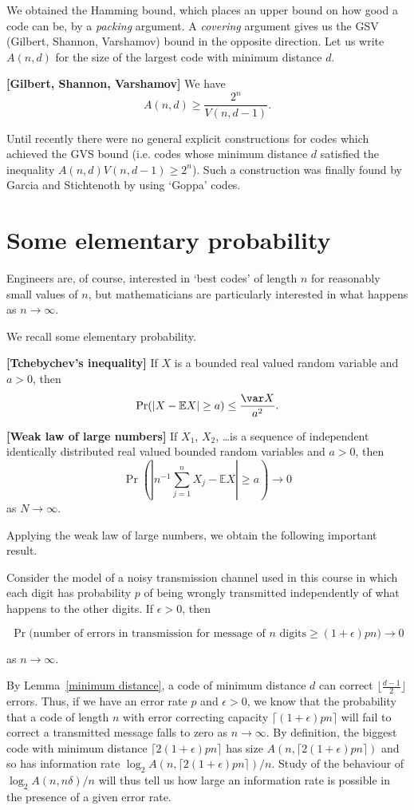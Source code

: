 We obtained the Hamming bound, which
places an upper bound on how good
a code can be, by a \emph{packing} argument.
A \emph{covering} argument gives
us the GSV (Gilbert, Shannon, Varshamov) bound
in the opposite direction. Let us write
$A(n,d)$ for the size of the largest code
with minimum distance $d$.
\begin{theorem} {\bf [Gilbert, Shannon, Varshamov]}\label{GSV}
We have
\[A(n,d)\geq \frac{2^{n}}{V(n,d-1)}.\]
\end{theorem}
Until recently there were no general explicit
constructions for codes which achieved the
GVS bound (i.e. codes whose minimum distance
$d$ satisfied the inequality $A(n,d)V(n,d-1)\geq 2^{n}$).
Such a construction
was finally found by Garcia and Stichtenoth by
using `Goppa' codes.
\section{Some elementary probability}
Engineers are, of course, interested in `best codes'
of length $n$ for reasonably small values of $n$,
but mathematicians are particularly interested
in what happens as $n\rightarrow\infty$.

We recall some elementary probability.
\begin{lemma} {\bf [Tchebychev's inequality]}
If $X$ is a bounded real valued random variable
and $a>0$, then
\[\Pr(|X-{\mathbb E}X|\geq a)\leq\frac{\var X}{a^{2}}.\]
\end{lemma}
\begin{theorem} {\bf [Weak law of large numbers]}
If $X_{1}$, $X_{2}$, \dots is a sequence of independent
identically distributed real valued bounded
random variables and $a>0$, then
\[\Pr\left(\left|n^{-1}\sum_{j=1}^{n}X_{j}
-{\mathbb E}X\right|\geq a\right)\rightarrow 0\]
as $N\rightarrow\infty$.
\end{theorem}
Applying the weak law of large numbers,
we obtain the following important result.
\begin{lemma} Consider the model of a noisy transmission
channel used in this course in which each digit
has probability $p$ of being wrongly transmitted
independently of what happens to the other digits.
If $\epsilon>0$, then
\begin{small}
\[\Pr\big(\text{number of errors in transmission for
message of $n$ digits}\geq (1+\epsilon)pn\big) \rightarrow 0\]
\end{small}
as $n\rightarrow\infty$.
\end{lemma}
By
Lemma~\ref{minimum distance},
a code of minimum distance
$d$ can correct
$\lfloor\frac{d-1}{2}\rfloor$ errors.
Thus, if we have an error rate $p$
and $\epsilon>0$, we know that
the probability that a
code of length $n$ with error correcting capacity
$\lceil (1+\epsilon)pn\rceil$
will fail to correct a transmitted message
falls to zero as $n\rightarrow\infty$.
By definition, the biggest code with
minimum distance $\lceil 2(1+\epsilon)pn \rceil$
has size $A(n,\lceil 2(1+\epsilon)pn \rceil)$
and so has information rate
$\log_{2}A(n,\lceil 2(1+\epsilon)pn \rceil)/n$.
Study of the behaviour of $\log_{2}A(n,n\delta)/n$
will thus tell us how large an information
rate is possible in the presence of a given error
rate.


